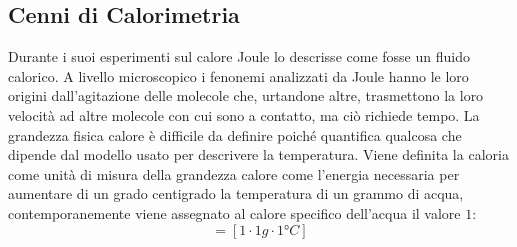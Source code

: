 \documentclass{article}
\numberwithin{equation}{subsection}
\begin{document}
\subsection{Cenni di Calorimetria}
Durante i suoi esperimenti sul calore Joule lo descrisse come 
fosse un fluido calorico. A livello microscopico i fenonemi 
analizzati da Joule hanno le loro origini dall'agitazione 
delle molecole che, urtandone altre, trasmettono la loro 
velocità ad altre molecole con cui sono a contatto, ma ciò 
richiede tempo. La grandezza fisica calore è difficile da 
definire poiché quantifica qualcosa che dipende dal modello 
usato per descrivere la temperatura. Viene definita la 
caloria come unità di misura della grandezza calore come 
l'energia necessaria per aumentare di un grado centigrado 
la temperatura 
di un grammo di acqua, contemporanemente viene assegnato al 
calore specifico dell'acqua il valore $1$:
\begin{equation}
    [cal]=[1\cdot 1g \cdot 1\mbox{°}C]
\end{equation}
\end{document}
